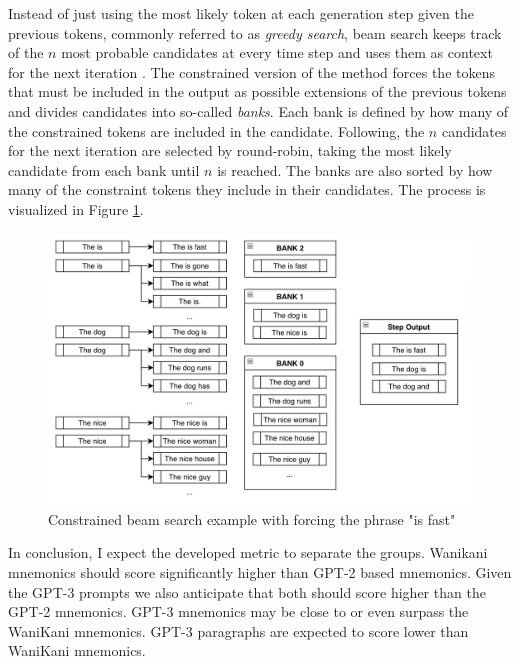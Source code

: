 Instead of just using the most likely token at each generation step given the previous tokens, commonly referred to as \emph{greedy search}, beam search keeps track of the $n$ most probable candidates at every time step and uses them as context for the next iteration \cite{kim2022guiding}. The constrained version of the method forces the tokens that must be included in the output as possible extensions of the previous tokens and divides candidates into so-called \emph{banks}. Each bank is defined by how many of the constrained tokens are included in the candidate. Following, the $n$ candidates for the next iteration are selected by round-robin, taking the most likely candidate from each bank until $n$ is reached. The banks are also sorted by how many of the constraint tokens they include in their candidates. The process is visualized in Figure \ref{figure:constrained_beam_search_example}.  
\begin{figure}
    \centering
    \includegraphics[width=400pt]{resources/cbeam_2.jpg}
    \caption{Constrained beam search example with forcing the phrase "is fast" \cite{kim2022guiding}}
    \label{figure:constrained_beam_search_example}
\end{figure}
\newline
\newline
In conclusion, I expect the developed metric to separate the groups. Wanikani mnemonics should score significantly higher than GPT-2 based mnemonics. Given the GPT-3 prompts we also anticipate that both should score higher than the GPT-2 mnemonics. GPT-3 mnemonics may be close to or even surpass the WaniKani mnemonics. GPT-3 paragraphs are expected to score lower than WaniKani mnemonics.
